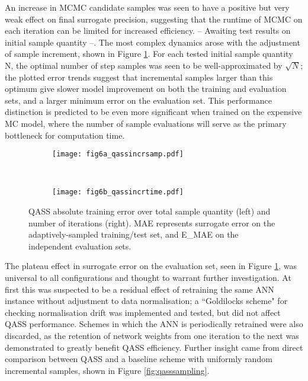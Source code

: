 An increase in MCMC candidate samples was seen to have a positive but very weak effect on final surrogate precision, suggesting that the runtime of MCMC on each iteration can be limited for increased efficiency. -- Awaiting test results on initial sample quantity --. The most complex dynamics arose with the adjustment of sample increment, shown in Figure \ref{fig:qassincr}. For each tested initial sample quantity N, the optimal number of step samples was seen to be well-approximated by $\sqrt{N}$; the plotted error trends suggest that incremental samples larger than this optimum give slower model improvement on both the training and evaluation sets, and a larger minimum error on the evaluation set. This performance distinction is predicted to be even more significant when trained on the expensive MC model, where the number of sample evaluations will serve as the primary bottleneck for computation time.
\begin{figure}[h!]
    \centering
    \begin{subfigure}[t]{0.5\textwidth}
        \centering
        \texttt{[image: fig6a\_qassincrsamp.pdf]}
    \end{subfigure}%
    ~ 
    \begin{subfigure}[t]{0.5\textwidth}
        \centering
        \texttt{[image: fig6b\_qassincrtime.pdf]}
    \end{subfigure}
    \caption{QASS absolute training error over total sample quantity (left) and number of iterations (right). MAE represents surrogate error on the adaptively-sampled training/test set, and E\_MAE on the independent evaluation sets.}
    \label{fig:qassincr}
\end{figure}

The plateau effect in surrogate error on the evaluation set, seen in Figure \ref{fig:qassincr}, was universal to all configurations and thought to warrant further investigation. At first this was suspected to be a residual effect of retraining the same ANN instance without adjustment to data normalisation; a ``Goldilocks scheme" for checking normalisation drift was implemented and tested, but did not affect QASS performance. Schemes in which the ANN is periodically retrained were also discarded, as the retention of network weights from one iteration to the next was demonstrated to greatly benefit QASS efficiency. Further insight came from direct comparison between QASS and a baseline scheme with uniformly random incremental samples, shown in Figure \ref{fig:qasssampling}.

